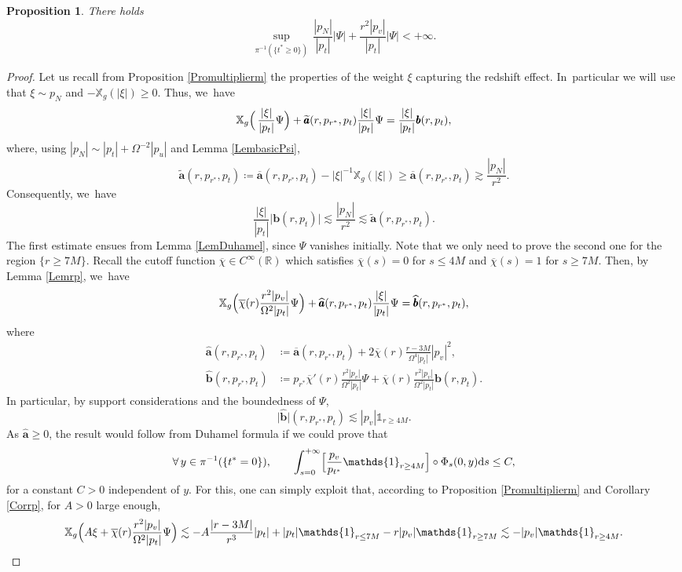 \documentclass[JEP,XML,SOM,Unicode,published]{cedram}
\theoremstyle{plain}
\newtheorem{proposition}{Proposition}[section]
\theoremstyle{definition}
\newcommand\R{{\mathbb{R}}}
\newcommand\T{{\mathbb{X}}}
\newcommand\dr{{\mathrm{d}}}
\begin{document}
\begin{proposition}\label{ProboundPsiA}
There holds
\[
\sup_{ \pi^{-1} (\{t^* \geq 0 \})} \, \frac{|p_N|}{|p_t|}|\Psi|+\frac{r^2|p_v|}{|p_t|}|\Psi| < +\infty.
\]
\end{proposition}
\begin{proof}
Let us recall from Proposition \ref{Promultiplierm} the properties of the weight $\xi$ capturing the redshift effect. In~particular we will use that $\xi \sim p_N$ and $-\T_g(|\xi|) \geq 0$. Thus, we~have
\begin{equation*}
\T_g \Bigl(\, \frac{|\xi|}{|p_t|} \Psi \Bigr)+ \widetilde{\pmb{a}} (r,p_{r^*},p_t)\frac{|\xi|}{|p_t|} \Psi= \frac{|\xi|}{|p_t|}\pmb{b}(r,p_t),
\end{equation*}
where, using $|p_N|\sim |p_t|+\Omega^{-2} |p_u|$ and Lemma \ref{LembasicPsi},
\[
\widetilde{\pmb{a}} (r,p_{r^*},p_t) \coloneqq \overline{\pmb{a}} (r,p_{r^*},p_t)-|\xi|^{-1}\T_g(|\xi|) \geq \overline{\pmb{a}} (r,p_{r^*},p_t) \gtrsim \frac{|p_N|}{r^2}.
\]
Consequently, we~have
\[
\frac{|\xi|}{|p_t|} \big| \pmb{b} (r,p_t) \big| \lesssim \frac{|p_N|}{r^2} \lesssim \widetilde{\pmb{a}} (r,p_{r^*},p_t).
\]
The first estimate ensues from Lemma \ref{LemDuhamel}, since $\Psi$ vanishes initially. Note that we only need to prove the second one for the region $\{ r \geq 7M \}$. Recall the cutoff function $\overline{\chi} \in C^\infty (\R)$ which satisfies $\overline{\chi} (s) =0$ for $s \leq 4M$ and $\overline{\chi}(s) =1$ for $s \geq 7M$. Then, by Lemma \ref{Lemrp}, we~have
\begin{equation*}
\T_g \Bigl(\overline{\chi} (r) \frac{r^2|p_v|}{\Omega^2|p_t|} \Psi \Bigr)+ \widehat{\pmb{a}} (r,p_{r^*},p_t)\frac{|\xi|}{|p_t|} \Psi= \widehat{\pmb{b}}(r,p_{r^*},p_t),
\end{equation*}
where
\begin{align*}
\widehat{\pmb{a}} (r,p_{r^*},p_t) & \coloneqq \overline{\pmb{a}} (r,p_{r^*},p_t)+2\overline{\chi}(r)\frac{r-3M}{\Omega^4|p_t|}|p_v|^2, \\
\widehat{\pmb{b}}(r,p_{r^*},p_t) & \coloneqq p_{r^*} \overline{\chi}'(r)\frac{r^2|p_v|}{\Omega^2|p_t|} \Psi+ \overline{\chi} (r) \frac{r^2|p_v|}{\Omega^2|p_t|}\pmb{b}(r,p_t).
\end{align*}
In particular, by support considerations and the boundedness of $\Psi$,
\[
\big| \widehat{\pmb{b}} \big|(r,p_{r^*},p_t) \lesssim |p_v| \mathds{1}_{r \geq 4M}.
\]
As $\widehat{\pmb{a}} \geq 0$, the result would follow from Duhamel formula if we could prove that
\[
\forall \, y \in \pi^{-1}(\{t^*=0\}), \qquad \int_{s=0}^{+\infty} \Bigl[ \frac{p_v}{p_{t^*}} \mathds{1}_{r \geq 4M} \Bigr] \circ \Phi_s (0,y) \dr s \leq C,
\]
for a constant $C>0$ independent of $y$. For this, one can simply exploit that, according to Proposition \ref{Promultiplierm} and Corollary \ref{Corrp}, for $A>0$ large enough,
\[
\T_g \Bigl(A \xi + \overline{\chi} (r) \frac{r^2|p_v|}{\Omega^2|p_t|} \Psi \Bigr) \lesssim -A\frac{|r-3M|}{r^3}|p_t|+ |p_t|\mathds{1}_{r \leq 7M}-r|p_v| \mathds{1}_{r \geq 7M} \lesssim -|p_v| \mathds{1}_{r \geq 4M}.
\]
\end{proof}
\end{document}
